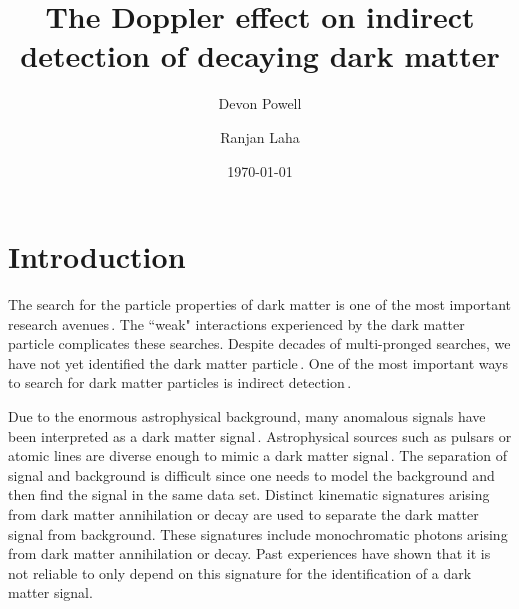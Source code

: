 \documentclass[aps,prl,10pt,twocolumn,superscriptaddress,showpacs]{revtex4-1}
\begin{document}
\title{The Doppler effect on indirect detection of decaying dark matter}
\author{Devon Powell}
\author{Ranjan Laha}
\date{\today}

\begin{abstract}
\cite{speckhard2016}
\end{abstract}


\maketitle


\section{Introduction}
\label{sec:Introduction}

The search for the particle properties of dark matter is one of the most important research avenues\,\cite{Jungman:1995df,Bertone:2004pz,Strigari:2013iaa}.  The ``weak" interactions experienced by the dark matter particle complicates these searches.  Despite decades of multi-pronged searches, we have not yet identified the dark matter particle\,\cite{Bertone:2016nfn}.  One of the most important ways to search for dark matter particles is indirect detection\,\cite{Klasen:2015uma}.

Due to the enormous astrophysical background, many anomalous signals have been interpreted as a  dark matter signal\,\cite{Abazajian:2014hsa,Daylan:2014rsa,Lee:2015fea,Bartels:2015aea,Bulbul:2014sua,Boyarsky:2014jta,Urban:2014yda}.  Astrophysical sources such as pulsars or atomic lines are diverse enough to mimic a dark matter signal\,\cite{O'Leary:2015gfa,Brandt:2015ula,O'Leary:2016osi,Gu:2015gqm,Phillips:2015wla,Shah:2016efh}.  The separation of signal and background is difficult since one needs to model the background and then find the signal in the same data set.  Distinct kinematic signatures arising from dark matter annihilation or decay are used to separate the dark matter signal from background.  These signatures include monochromatic photons arising from dark matter annihilation or decay.  Past experiences have shown that it is not reliable to only depend on this signature for the identification of a dark matter signal.
\end{document}
